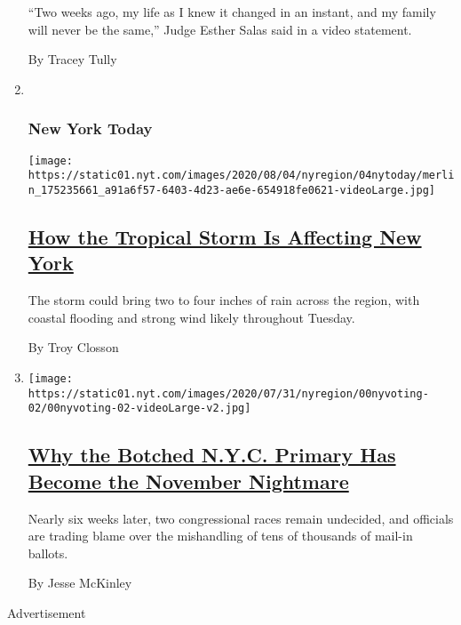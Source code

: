 \begin{enumerate}
  ``Two weeks ago, my life as I knew it changed in an instant, and my
  family will never be the same,'' Judge Esther Salas said in a video
  statement.

  By Tracey Tully
\item ~
  \hypertarget{new-york-today}{%
  \subsubsection{New York Today}\label{new-york-today}}

  \texttt{[image: https://static01.nyt.com/images/2020/08/04/nyregion/04nytoday/merlin\_175235661\_a91a6f57-6403-4d23-ae6e-654918fe0621-videoLarge.jpg]}

  \hypertarget{how-the-tropical-storm-is-affecting-new-york}{%
  \subsection{\texorpdfstring{\href{/2020/08/04/nyregion/isaias-tropical-storm-nyc.html}{How
  the Tropical Storm Is Affecting New
  York}}{How the Tropical Storm Is Affecting New York}}\label{how-the-tropical-storm-is-affecting-new-york}}

  The storm could bring two to four inches of rain across the region,
  with coastal flooding and strong wind likely throughout Tuesday.~

  By Troy Closson
\item
  \texttt{[image: https://static01.nyt.com/images/2020/07/31/nyregion/00nyvoting-02/00nyvoting-02-videoLarge-v2.jpg]}

  \hypertarget{why-the-botched-nyc-primary-has-become-the-november-nightmare}{%
  \subsection{\texorpdfstring{\href{/2020/08/03/nyregion/nyc-mail-ballots-voting.html}{Why
  the Botched N.Y.C. Primary Has Become the November
  Nightmare}}{Why the Botched N.Y.C. Primary Has Become the November Nightmare}}\label{why-the-botched-nyc-primary-has-become-the-november-nightmare}}

  Nearly six weeks later, two congressional races remain undecided, and
  officials are trading blame over the mishandling of tens of thousands
  of mail-in ballots.

  By Jesse McKinley
\end{enumerate}

Advertisement

